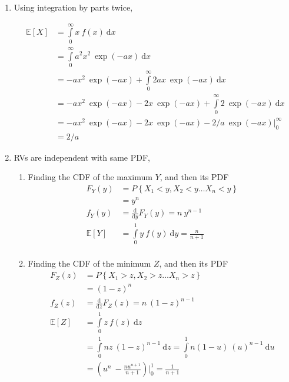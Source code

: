 \begin{enumerate}
	
	\item Using integration by parts twice,
	
		\begin{align}
			\mathbb{E}[X] &= \int\limits_{0}^{\infty} x\ f(x)\ \mathrm{d}x \nonumber \\
			&= \int\limits_{0}^{\infty} a^2 x^2\ \exp(-ax)\ \mathrm{d}x \nonumber \\
			&= -a x^2\ \exp(-ax) + \int\limits_{0}^{\infty} 2a x\ \exp(-ax)\ \mathrm{d}x \nonumber \\
			&= -a x^2\ \exp(-ax) - 2x\ \exp(-ax)  + \int\limits_{0}^{\infty} 2\ \exp(-ax)\ \mathrm{d}x \nonumber \\
			&= -a x^2\ \exp(-ax) - 2x\ \exp(-ax)  -  2/a \ \exp(-ax)  \Big|_0^\infty \nonumber \\
			&= 2/a 
		\end{align}
	
	
	\item RVs are independent with same PDF,
	
		\begin{enumerate}
			\item Finding the CDF of the maximum $ Y $, and then its PDF\\
			\begin{align}
				F_Y (y) &= P\left\{X_1 < y, X_2 < y \dots X_n < y\right\} \nonumber \\
				&= y^n \\
				f_Y (y) &= \frac{\mathrm{d}}{\mathrm{d} y} F_Y (y) = n\ y^{n-1} \\
				\mathbb{E}[Y] &= \int\limits_{0}^{1} y\ f(y)\ \mathrm{d}y = \frac{n}{n+1} \\
			\end{align}
			
			\item Finding the CDF of the minimum $ Z $, and then its PDF\\
			\begin{align}
				F_Z (z) &= P\left\{X_1 > z, X_2 > z \dots X_n > z\right\} \nonumber \\
				&= (1-z)^n \\
				f_Z (z) &= \frac{\mathrm{d}}{\mathrm{d} z} F_Z (z) = n\ (1 - z)^{n-1} \\
				\mathbb{E}[Z] &= \int\limits_{0}^{1} z\ f(z)\ \mathrm{d}z \nonumber \\
				&= \int\limits_{0}^{1} nz\ (1 - z)^{n-1}\ \mathrm{d}z = \int\limits_{0}^{1} n(1 - u)\ (u)^{n-1}\ \mathrm{d}u \nonumber \\
				&= \left(u^n\ - \frac{n u^{n+1}}{n+1}\right)  \Big|_0^1 = \frac{1}{n+1}
			\end{align}
			

\end{enumerate}
\end{enumerate}
